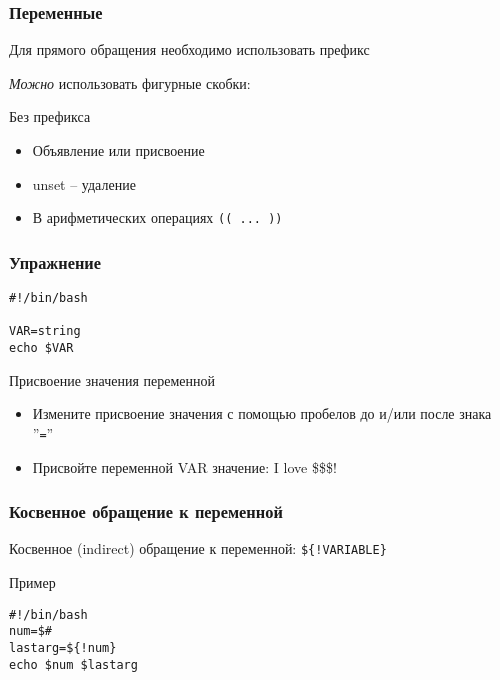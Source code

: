 

\begin{frame}
	\frametitle{Переменные}

	\large{}

	Для прямого обращения необходимо использовать префикс \\
	\center{\Large{\tt \$}}

	{\it Можно} использовать фигурные скобки:\\

	\bigskip
	
	\begin{alertblock}{Без префикса}
		\begin{itemize}
			\item Объявление или присвоение
			\item unset -- удаление
			\item В арифметических операциях {\tt (( ... ))}
		\end{itemize}
	\end{alertblock}
\end{frame}

\begin{frame}[fragile]
	\frametitle{Упражнение}

	\begin{lstlisting}
#!/bin/bash

VAR=string
echo $VAR
	\end{lstlisting}


	\begin{block}{Присвоение значения переменной}
		\begin{itemize}
			\item Измените присвоение значения с помощью пробелов до и/или после знака ''{\tt =}''
			\item Присвойте переменной VAR значение: I love \$\$\$!
		\end{itemize}
	\end{block}

\end{frame}

\begin{frame}[fragile]
	\frametitle{Косвенное обращение к переменной}

	Косвенное (indirect) обращение к переменной: {\tt \$\{!VARIABLE\}}

	\begin{block}{Пример}
		\begin{lstlisting}
#!/bin/bash 
num=$# 
lastarg=${!num} 
echo $num $lastarg
		\end{lstlisting}
	\end{block}

\end{frame}


